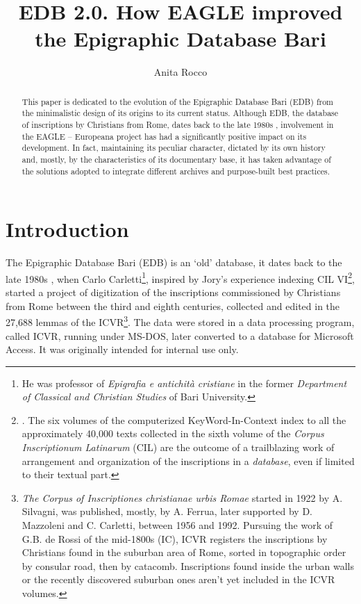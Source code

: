 \documentclass[amsthm,ebook]{saparticle}
\title{EDB 2.0.
How EAGLE improved the Epigraphic Database Bari}
\author[uniba]{Anita Rocco \corref{first}}
\begin{document}
\maketitle
\begin{abstract}
This paper is dedicated to the evolution of the Epigraphic Database Bari (EDB) from the minimalistic design of its
origins to its current status. Although EDB, the database of inscriptions by Christians from Rome, dates back to the
late 1980s , involvement in the EAGLE – Europeana project has had a significantly positive impact on its development.
In fact, maintaining its peculiar character, dictated by its own history and, mostly, by the characteristics of its
documentary base, it has taken advantage of the solutions adopted to integrate different archives and purpose-built
best practices. 
\end{abstract}










\section{Introduction}


\noindent The Epigraphic Database Bari (EDB) is an `old' database, it dates back to the late 1980s , when Carlo Carletti\footnote{
He was professor of \emph{Epigrafia e antichità cristiane} in the former \emph{Department of Classical and Christian Studies} of Bari
University.}, inspired by Jory's experience indexing CIL VI\footnote{\citet{_corpus_1974}. The six volumes of the
computerized KeyWord-In-Context index to all the approximately 40,000 texts collected in the sixth volume of the \emph{Corpus
Inscriptionum Latinarum} (CIL) are the outcome of a trailblazing work of arrangement and organization of the
inscriptions in a \emph{database}, even if limited to their textual part.}, started a project of digitization of the
inscriptions commissioned by Christians from Rome between the third and eighth centuries, collected and edited in the
27,688 lemmas of the ICVR\footnote{\emph{The Corpus of Inscriptiones christianae urbis Romae} started in 1922 by A. Silvagni,
was published, mostly, by A. Ferrua, later supported by D. Mazzoleni and C. Carletti, between 1956 and 1992. Pursuing
the work of G.B. de Rossi of the mid-1800s (IC), ICVR registers the inscriptions by Christians found in the suburban
area of Rome, sorted in topographic order by consular road, then by catacomb. Inscriptions found inside the urban walls
or the recently discovered suburban ones aren’t yet included in the ICVR volumes.}. The data were stored in a data
processing program, called ICVR, running under MS-DOS, later converted to a database for Microsoft Access. It was
originally intended for internal use only.
\end{document}
